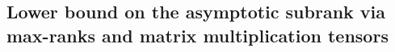 \subsection{Lower bound on the asymptotic subrank via max-ranks and matrix multiplication tensors}\label{subsec:lb-mamu}
